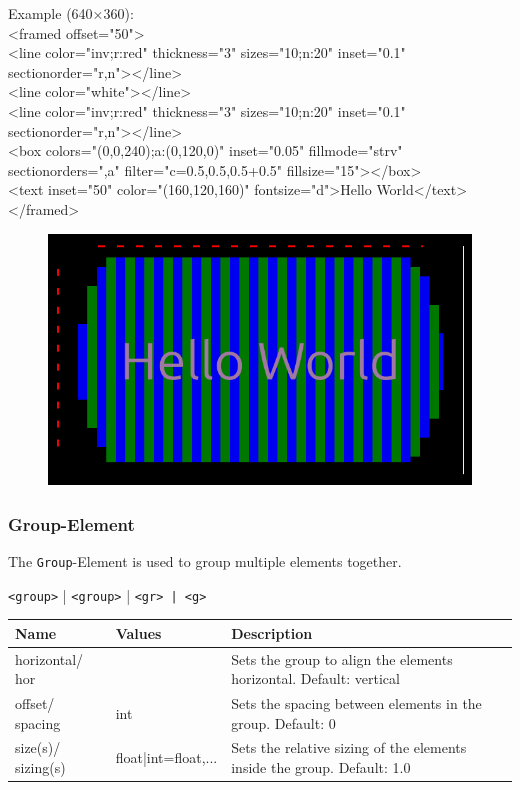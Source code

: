 \documentclass[a4paper,11pt]{article}
\begin{document}
Example (640×360):\\
<framed offset="50">\\
  <line color="inv;r:red" thickness="3" sizes="10;n:20" inset="0.1" sectionorder="r,n"></line>\\
  <line color="white"></line>\\
  <line color="inv;r:red" thickness="3" sizes="10;n:20" inset="0.1" sectionorder="r,n"></line>\\
  <box colors="(0,0,240);a:(0,120,0)" inset="0.05" fillmode="strv" sectionorders=",a" filter="c=0.5,0.5,0.5+0.5" fillsize="15"></box>\\
  <text inset="50" color="(160,120,160)" fontsize="d">Hello World</text>\\
</framed>
\begin{figure}[h]
    \centering
    \includegraphics[width=0.5\linewidth]{images/framed.png}
\end{figure}



\newpage
\hypertarget{group}{}
\subsubsection*{Group-Element}
The \texttt{Group}-Element is used to group multiple elements together.
\begin{center}
    \texttt{<group>} | \texttt{<group>} | \texttt{<gr> | \texttt{<g>}}
\end{center}

\renewcommand{\arraystretch}{1.3}
\begin{tcolorbox}[colback=white, colframe=black!75, title=Arguments]
\begin{tabularx}{\linewidth}{p{50pt}|p{110pt}|X}
\textbf{Name} & \textbf{Values} & \textbf{Description}\\
\hline
horizontal/ hor & & Sets the group to align the elements horizontal. Default: vertical\\
\rowcolor[HTML]{E8E8E8}
offset/ spacing & int & Sets the spacing between elements in the group. Default: 0\\
size(s)/ sizing(s) & float|int=float,... & Sets the relative sizing of the elements inside the group. Default: 1.0\\
\end{tabularx}
\end{tcolorbox}
\end{document}
